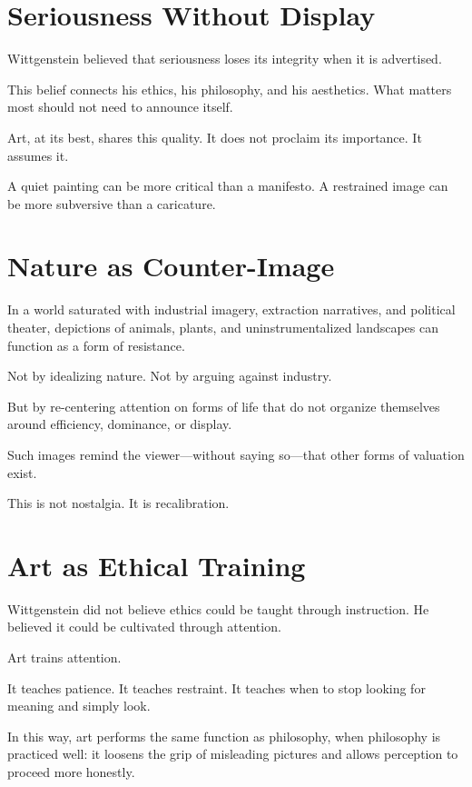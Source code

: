 \documentclass[11pt]{article}
\begin{document}
\section*{Seriousness Without Display}

Wittgenstein believed that seriousness loses its integrity when it is advertised.

This belief connects his ethics, his philosophy, and his aesthetics. What matters most should not need to announce itself.

Art, at its best, shares this quality. It does not proclaim its importance. It assumes it.

A quiet painting can be more critical than a manifesto. A restrained image can be more subversive than a caricature.

\section*{Nature as Counter-Image}

In a world saturated with industrial imagery, extraction narratives, and political theater, depictions of animals, plants, and uninstrumentalized landscapes can function as a form of resistance.

Not by idealizing nature.  
Not by arguing against industry.  

But by re-centering attention on forms of life that do not organize themselves around efficiency, dominance, or display.

Such images remind the viewer—without saying so—that other forms of valuation exist.

This is not nostalgia. It is recalibration.

\section*{Art as Ethical Training}

Wittgenstein did not believe ethics could be taught through instruction. He believed it could be cultivated through attention.

Art trains attention.

It teaches patience.  
It teaches restraint.  
It teaches when to stop looking for meaning and simply look.

In this way, art performs the same function as philosophy, when philosophy is practiced well: it loosens the grip of misleading pictures and allows perception to proceed more honestly.
\end{document}
